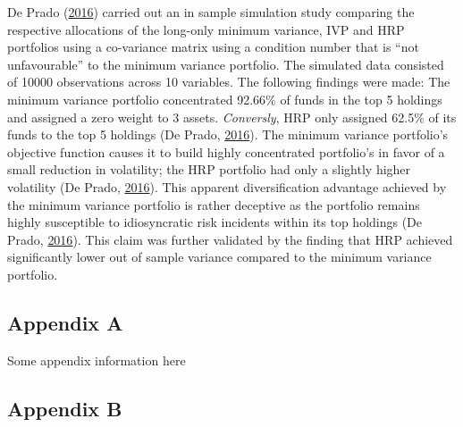 \documentclass[11pt,preprint, authoryear]{elsarticle}
\numberwithin{equation}{section}
\numberwithin{figure}{section}
\numberwithin{table}{section}
\begin{document}
De Prado (\protect\hyperlink{ref-lopez}{2016}) carried out an in sample
simulation study comparing the respective allocations of the long-only
minimum variance, IVP and HRP portfolios using a co-variance matrix
using a condition number that is ``not unfavourable'' to the minimum
variance portfolio. The simulated data consisted of 10000 observations
across 10 variables. The following findings were made: The minimum
variance portfolio concentrated 92.66\% of funds in the top 5 holdings
and assigned a zero weight to 3 assets. \emph{Conversly}, HRP only
assigned 62.5\% of its funds to the top 5 holdings (De Prado,
\protect\hyperlink{ref-lopez}{2016}). The minimum variance portfolio's
objective function causes it to build highly concentrated portfolio's in
favor of a small reduction in volatility; the HRP portfolio had only a
slightly higher volatility (De Prado,
\protect\hyperlink{ref-lopez}{2016}). This apparent diversification
advantage achieved by the minimum variance portfolio is rather deceptive
as the portfolio remains highly susceptible to idiosyncratic risk
incidents within its top holdings (De Prado,
\protect\hyperlink{ref-lopez}{2016}). This claim was further validated
by the finding that HRP achieved significantly lower out of sample
variance compared to the minimum variance portfolio.

\hypertarget{appendix-a}{%
\subsection*{Appendix A}\label{appendix-a}}

Some appendix information here

\hypertarget{appendix-b}{%
\subsection*{Appendix B}\label{appendix-b}}


\end{document}
